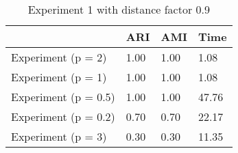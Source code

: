 \begin{table}
\centering
\caption{Experiment 1 with distance factor 0.9}
\begin{tabular}{llll}
\toprule
{} &   ARI &   AMI &   Time \\
\midrule
Experiment (p = 2)   &  1.00 &  1.00 &   1.08 \\
Experiment (p = 1)   &  1.00 &  1.00 &   1.08 \\
Experiment (p = 0.5) &  1.00 &  1.00 &  47.76 \\
Experiment (p = 0.2) &  0.70 &  0.70 &  22.17 \\
Experiment (p = 3)   &  0.30 &  0.30 &  11.35 \\
\bottomrule
\end{tabular}
\end{table}
